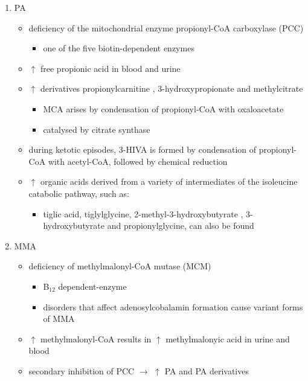 \documentclass{scrartcl}
\begin{document}
\begin{enumerate}
\item PA
\label{sec:org88c9805}
\begin{itemize}
\item deficiency of the mitochondrial enzyme propionyl-CoA carboxylase (PCC)
\begin{itemize}
\item one of the five biotin-dependent enzymes
\end{itemize}
\item \(\uparrow\) free propionic acid in blood and urine
\item \(\uparrow\) derivatives propionylcarnitine , 3-hydroxypropionate and methylcitrate
\begin{itemize}
\item MCA arises by condensation of propionyl-CoA with oxaloacetate
\item catalysed by citrate synthase
\end{itemize}
\item during ketotic episodes, 3-HIVA is formed by condensation of
propionyl-CoA with acetyl-CoA, followed by chemical reduction
\item \(\uparrow\) organic acids derived from a variety of intermediates of
the isoleucine catabolic pathway, such as:
\begin{itemize}
\item tiglic acid, tiglylglycine, 2-methyl-3-hydroxybutyrate ,
3-hydroxybutyrate and propionylglycine, can also be found
\end{itemize}
\end{itemize}

\item MMA
\label{sec:org544149e}
\begin{itemize}
\item deficiency of methylmalonyl-CoA mutase (MCM)
\begin{itemize}
\item B\(_{\text{12}}\) dependent-enzyme
\item disorders that affect adenosylcobalamin formation cause variant
forms of MMA
\end{itemize}
\item \(\uparrow\) methylmalonyl-CoA results in \(\uparrow\) methylmalonyic acid
in urine and blood
\item secondary inhibition of PCC \(\to\) \(\uparrow\) PA and PA derivatives
\end{itemize}


\end{enumerate}
\end{document}
